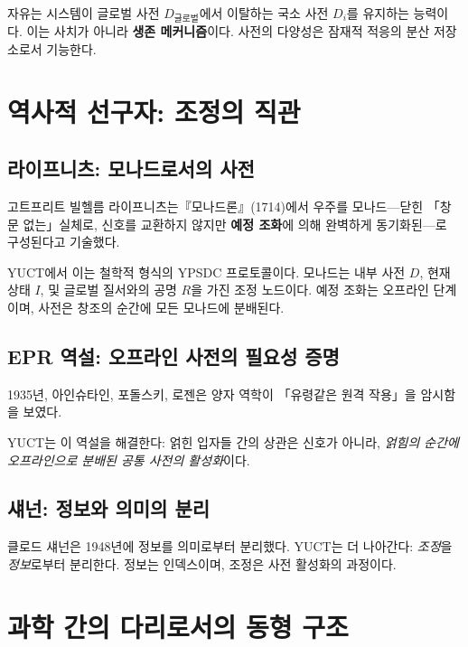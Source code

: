 \documentclass[11pt,a4paper]{article}
\begin{document}
	자유는 시스템이 글로벌 사전 \(D_{\text{글로벌}}\)에서 이탈하는 국소 사전 \(D_i\)를 유지하는 능력이다. 이는 사치가 아니라 \textbf{생존 메커니즘}이다. 사전의 다양성은 잠재적 적응의 분산 저장소로서 기능한다.
	
	\section{역사적 선구자: 조정의 직관}
	
	\subsection{라이프니츠: 모나드로서의 사전}
	
	고트프리트 빌헬름 라이프니츠는『모나드론』(1714)에서 우주를 모나드—닫힌 「창문 없는」실체로, 신호를 교환하지 않지만 \textbf{예정 조화}에 의해 완벽하게 동기화된—로 구성된다고 기술했다.
	
	YUCT에서 이는 철학적 형식의 YPSDC 프로토콜이다. 모나드는 내부 사전 \(D\), 현재 상태 \(I\), 및 글로벌 질서와의 공명 \(R\)을 가진 조정 노드이다. 예정 조화는 오프라인 단계이며, 사전은 창조의 순간에 모든 모나드에 분배된다.
	
	\subsection{EPR 역설: 오프라인 사전의 필요성 증명}
	
	1935년, 아인슈타인, 포돌스키, 로젠은 양자 역학이 「유령같은 원격 작용」을 암시함을 보였다.
	
	YUCT는 이 역설을 해결한다: 얽힌 입자들 간의 상관은 신호가 아니라, \emph{얽힘의 순간에 오프라인으로 분배된 공통 사전의 활성화}이다.
	
	\subsection{섀넌: 정보와 의미의 분리}
	
	클로드 섀넌은 1948년에 정보를 의미로부터 분리했다. YUCT는 더 나아간다: \emph{조정}을 \emph{정보}로부터 분리한다. 정보는 인덱스이며, 조정은 사전 활성화의 과정이다.
	
	\section{과학 간의 다리로서의 동형 구조}
	\label{sec:isomorphisms}
	
\end{document}
